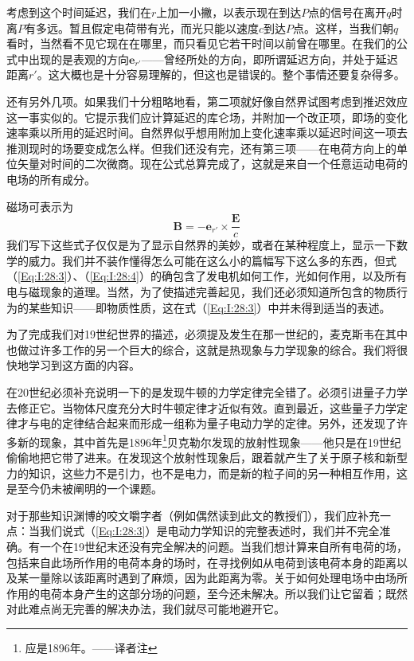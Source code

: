 考虑到这个时间延迟，我们在$r$上加一小撇，以表示现在到达$P$点的信号在离开$q$时离$P$有多远。暂且假定电荷带有光，而光只能以速度$c$到达$P$点。这样，当我们朝$q$看时，当然看不见它现在在哪里，而只看见它若干时间以前曾在哪里。在我们的公式中出现的是表观的方向$\boldsymbol{e}_{r'}$——曾经所处的方向，即所谓延迟方向，并处于延迟距离$r'$。这大概也是十分容易理解的，但这也是错误的。整个事情还要复杂得多。

还有另外几项。如果我们十分粗略地看，第二项就好像自然界试图考虑到推迟效应这一事实似的。它提示我们应计算延迟的库仑场，并附加一个改正项，即场的变化速率乘以所用的延迟时间。自然界似乎想用附加上变化速率乘以延迟时间这一项去推测现时的场要变成怎么样。但我们还没有完，还有第三项——在电荷方向上的单位矢量对时间的二次微商。现在公式总算完成了，这就是来自一个任意运动电荷的电场的所有成分。

磁场可表示为
\begin{equation}
    \label{Eq:I:28:4}
    \boldsymbol{B} = -\boldsymbol{e}_{r'} \times \frac{\boldsymbol{E}}{c}
\end{equation}
我们写下这些式子仅仅是为了显示自然界的美妙，或者在某种程度上，显示一下数学的威力。我们并不装作懂得怎么可能在这么小的篇幅写下这么多的东西，但式（\ref{Eq:I:28:3}）、（\ref{Eq:I:28:4}）的确包含了发电机如何工作，光如何作用，以及所有电与磁现象的道理。当然，为了使描述完善起见，我们还必须知道所包含的物质行为的某些知识——即物质性质，这在式（\ref{Eq:I:28:3}）中并未得到适当的表述。

为了完成我们对19世纪世界的描述，必须提及发生在那一世纪的，麦克斯韦在其中也做过许多工作的另一个巨大的综合，这就是热现象与力学现象的综合。我们将很快地学习到这方面的内容。

在20世纪必须补充说明一下的是发现牛顿的力学定律完全错了。必须引进量子力学去修正它。当物体尺度充分大时牛顿定律才近似有效。直到最近，这些量子力学定律才与电的定律结合起来而形成一组称为量子电动力学的定律。另外，还发现了许多新的现象，其中首先是1896年\footnote{应是1896年。——译者注}贝克勒尔发现的放射性现象——他只是在19世纪偷偷地把它带了进来。在发现这个放射性现象后，跟着就产生了关于原子核和新型力的知识，这些力不是引力，也不是电力，而是新的粒子间的另一种相互作用，这是至今仍未被阐明的一个课题。

对于那些知识渊博的咬文嚼字者（例如偶然读到此文的教授们），我们应补充一点：当我们说式（\ref{Eq:I:28:3}）是电动力学知识的完整表述时，我们并不完全准确。有一个在19世纪末还没有完全解决的问题。当我们想计算来自所有电荷的场，包括来自此场所作用的电荷本身的场时，在寻找例如从电荷到该电荷本身的距离以及某一量除以该距离时遇到了麻烦，因为此距离为零。关于如何处理电场中由场所作用的电荷本身产生的这部分场的问题，至今还未解决。所以我们让它留着；既然对此难点尚无完善的解决办法，我们就尽可能地避开它。

